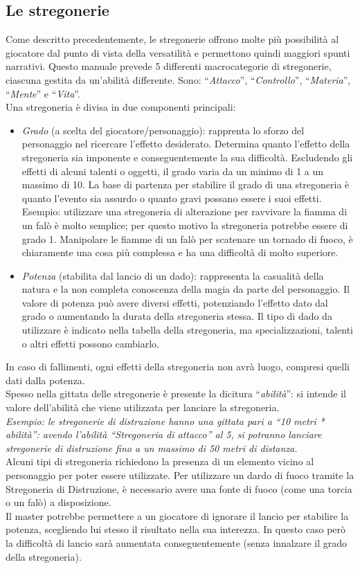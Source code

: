 \documentclass[../manuale_main.tex]{subfiles}
\begin{document}
\clearpage
\subsection{Le stregonerie}
Come descritto precedentemente, le stregonerie offrono molte più possibilità al giocatore dal punto di vista della versatilità e permettono quindi maggiori spunti narrativi.
Questo manuale prevede 5 differenti macrocategorie di stregonerie, ciascuna gestita da un'abilità differente.
Sono: ``\emph{Attacco}'', ``\emph{Controllo}'', ``\emph{Materia}'', ``\emph{Mente}'' e ``\emph{Vita}''.\\

Una stregoneria è divisa in due componenti principali:
\begin{itemize}
\item \emph{Grado} (a scelta del giocatore/personaggio): rapprenta lo sforzo del personaggio nel ricercare l'effetto desiderato. Determina quanto l'effetto della stregoneria sia imponente e conseguentemente la sua difficoltà. Escludendo gli effetti di alcuni talenti o oggetti, il grado varia da un minimo di 1 a un massimo di 10. La base di partenza per stabilire il grado di una stregoneria è quanto l’evento sia assurdo o quanto gravi possano essere i suoi effetti. Esempio: utilizzare una stregoneria di alterazione per ravvivare la fiamma di un falò è molto semplice; per questo motivo la stregoneria potrebbe essere di grado 1. Manipolare le fiamme di un falò per scatenare un tornado di fuoco, è chiaramente una cosa più complessa e ha una difficoltà di molto superiore.
\item \emph{Potenza} (stabilita dal lancio di un dado): rappresenta la casualità della natura e la non completa conoscenza della magia da parte del personaggio. Il valore di potenza può avere diversi effetti, potenziando l'effetto dato dal grado o aumentando la durata della stregoneria stessa. Il tipo di dado da utilizzare è indicato nella tabella della stregoneria, ma specializzazioni, talenti o altri effetti possono cambiarlo.
\end{itemize}
In caso di fallimenti, ogni effetti della stregoneria non avrà luogo, compresi quelli dati dalla potenza.\\
Spesso nella gittata delle stregonerie è presente la dicitura ``\emph{abilità}'': si intende il valore dell'abilità che viene utilizzata per lanciare la stregoneria.\\
\emph{Esempio: le stregonerie di distruzione hanno una gittata pari a ``10 metri * abilità'': avendo l'abilità ``Stregoneria di attacco'' al 5, si potranno lanciare stregonerie di distruzione fino a un massimo di 50 metri di distanza.}\\
Alcuni tipi di stregoneria richiedono la presenza di un elemento vicino al personaggio per poter essere utilizzate. Per utilizzare un dardo di fuoco tramite la Stregoneria di Distruzione, è necessario avere una fonte di fuoco (come una torcia o un falò) a disposizione.\\
Il master potrebbe permettere a un giocatore di ignorare il lancio per stabilire la potenza, scegliendo lui stesso il risultato nella sua interezza. In questo caso però la difficoltà di lancio sarà aumentata conseguentemente (senza innalzare il grado della stregoneria).\\
\end{document}
